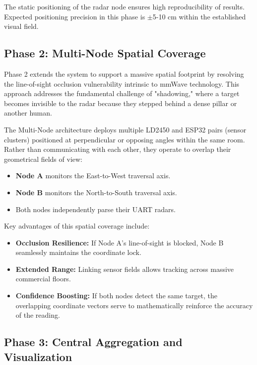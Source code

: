 The static positioning of the radar node ensures high reproducibility of results. Expected positioning precision in this phase is $\pm$5-10 cm within the established visual field.

\subsection{Phase 2: Multi-Node Spatial Coverage}
\label{subsec:phase2}

Phase 2 extends the system to support a massive spatial footprint by resolving the line-of-sight occlusion vulnerability intrinsic to mmWave technology. This approach addresses the fundamental challenge of "shadowing," where a target becomes invisible to the radar because they stepped behind a dense pillar or another human.

The Multi-Node architecture deploys multiple LD2450 and ESP32 pairs (sensor clusters) positioned at perpendicular or opposing angles within the same room. Rather than communicating with each other, they operate to overlap their geometrical fields of view:
\begin{itemize}
    \item \textbf{Node A} monitors the East-to-West traversal axis.
    \item \textbf{Node B} monitors the North-to-South traversal axis.
    \item Both nodes independently parse their UART radars.
\end{itemize}

Key advantages of this spatial coverage include:
\begin{itemize}
    \item \textbf{Occlusion Resilience:} If Node A's line-of-sight is blocked, Node B seamlessly maintains the coordinate lock.
    \item \textbf{Extended Range:} Linking sensor fields allows tracking across massive commercial floors.
    \item \textbf{Confidence Boosting:} If both nodes detect the same target, the overlapping coordinate vectors serve to mathematically reinforce the accuracy of the reading.
\end{itemize}

\subsection{Phase 3: Central Aggregation and Visualization}
\label{subsec:phase3}

